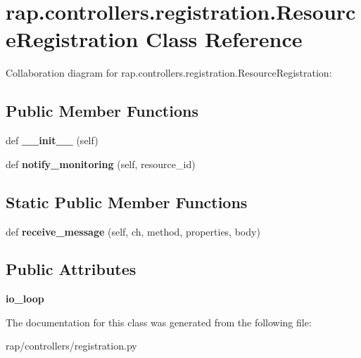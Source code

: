 \hypertarget{classrap_1_1controllers_1_1registration_1_1ResourceRegistration}{}\section{rap.\+controllers.\+registration.\+Resource\+Registration Class Reference}
\label{classrap_1_1controllers_1_1registration_1_1ResourceRegistration}


Collaboration diagram for rap.\+controllers.\+registration.\+Resource\+Registration\+:
\subsection*{Public Member Functions}
\begin{DoxyCompactItemize}
\item 
\mbox{\label{classrap_1_1controllers_1_1registration_1_1ResourceRegistration_a6c7b08c5420614c46063c19a3cdd66db}} 
def {\bfseries \+\_\+\+\_\+init\+\_\+\+\_\+} (self)
\item 
\mbox{\label{classrap_1_1controllers_1_1registration_1_1ResourceRegistration_a0f0d1c2e74a29bcda151a834a906e5e4}} 
def {\bfseries notify\+\_\+monitoring} (self, resource\+\_\+id)
\end{DoxyCompactItemize}
\subsection*{Static Public Member Functions}
\begin{DoxyCompactItemize}
\item 
\mbox{\label{classrap_1_1controllers_1_1registration_1_1ResourceRegistration_acf07a98741384d22d2d406686ff45203}} 
def {\bfseries receive\+\_\+message} (self, ch, method, properties, body)
\end{DoxyCompactItemize}
\subsection*{Public Attributes}
\begin{DoxyCompactItemize}
\item 
\mbox{\label{classrap_1_1controllers_1_1registration_1_1ResourceRegistration_a6c5d92f8721ffb8a6e4dfb9af1d0d038}} 
{\bfseries io\+\_\+loop}
\end{DoxyCompactItemize}


The documentation for this class was generated from the following file\+:\begin{DoxyCompactItemize}
\item 
rap/controllers/registration.\+py\end{DoxyCompactItemize}
